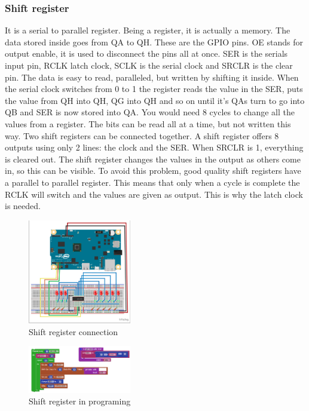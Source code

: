\subsubsection{Shift register}
It is a serial to parallel register. Being a register, it is actually a memory. The data stored inside goes from QA to QH. These are the GPIO pins. OE stands for output enable, it is used to disconnect the pins all at once. SER is the serials input pin, RCLK latch clock, SCLK is the serial clock and SRCLR is the clear pin. The data is easy to read, paralleled, but written by shifting it inside. When the serial clock switches from 0 to 1 the register reads the value in the SER, puts the value from QH into QH, QG into QH and so on until it's QAs turn to go into QB and SER is now stored into QA. You would need 8 cycles to change all the values from a register. The bits can be read all at a time, but not written this way.  
Two shift registers can be connected together.  
A shift register offers 8 outputs using only 2 lines: the clock and the SER. When SRCLR is 1, everything is cleared out. The shift register changes the values in the output as others come in, so this can be visible. To avoid this problem, good quality shift registers have a parallel to parallel register. This means that only when a cycle is complete the RCLK will switch and the values are given as output. This is why the latch clock is needed. 

\begin{figure}[ht]
    \centering
    \includegraphics[width=0.4\textwidth]{figures/Shift register connection.png}
    \caption{Shift register connection}
\end{figure}
\begin{figure}[ht]
    \centering
    \includegraphics[width=0.4\textwidth]{figures/Shift register in programing.png}
    \caption{Shift register in programing}
\end{figure}


